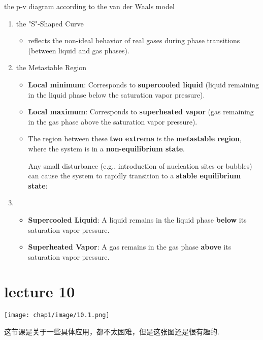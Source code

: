 \begin{example}
    the p-v diagram according to the van der Waals model 
    \begin{enumerate}
        \item the "S"-Shaped Curve
        \begin{itemize}
            \item reflects the non-ideal behavior of real gases during phase transitions (between liquid and gas phases).
        \end{itemize}
        \item the Metastable Region
        \begin{itemize}
            \item \textbf{Local minimum}: Corresponds to \textbf{supercooled liquid} (liquid remaining in the liquid phase below the saturation vapor pressure).
            \item \textbf{Local maximum}: Corresponds to \textbf{superheated vapor} (gas remaining in the gas phase above the saturation vapor pressure).
            \item The region between these \textbf{two extrema} is the \textbf{metastable region}, where the system is in a \textbf{non-equilibrium state}.
            
            Any small disturbance (e.g., introduction of nucleation sites or bubbles) can cause the system to rapidly transition to a \textbf{stable equilibrium state}:
        \end{itemize}
        \item \begin{itemize}
            \item \textbf{Supercooled Liquid}:
             A liquid remains in the liquid phase \textbf{below} its saturation vapor pressure.
            \item \textbf{Superheated Vapor}:
             A gas remains in the gas phase \textbf{above} its saturation vapor pressure.
        \end{itemize}
    \end{enumerate}
\end{example}
\section{lecture 10}
\begin{center}
    \texttt{[image: chap1/image/10.1.png]}
\end{center}
这节课是关于一些具体应用，都不太困难，但是这张图还是很有趣的.















\ifx\allfiles\undefined

\fi
